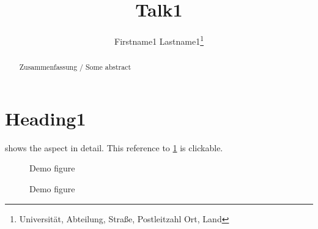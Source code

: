 \documentclass[english]{lni}
\begin{document}
\title{Talk1}
\author[Firstname1 Lastname1]
{Firstname1 Lastname1\footnote{Universität, Abteilung, Straße, Postleitzahl Ort,
Land }}
\maketitle

\begin{abstract}
Zusammenfassung / Some abstract
\end{abstract}
\section{Heading1}
\blindtext

 shows the aspect in detail.
This reference to \cref{fig:xy} is clickable.

\blindtext[3]

\begin{figure}[t]
\centering
Demo figure
\caption{Demo figure}
\label{fig:xy}
\end{figure}

\blindtext
\end{document}

